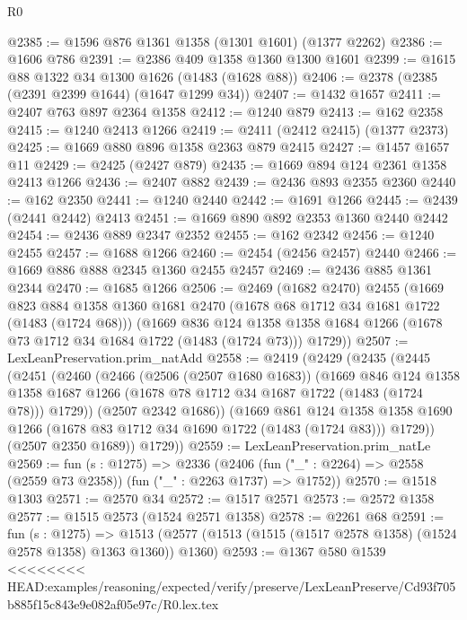 \begin{lexlean}{R0}
\begin{coremodule}
{{{{{{{{{{{{{{{{{{{{{{{{{{{{{{{{{{{{{{{{{{{{{{{{{{{{{{{{{{{{{{{{{{{{{{{{{{{{{{{{{{{{{{@2385 := @1596 @876 @1361 @1358 (@1301 @1601) (@1377 @2262)
@2386 := @1606 @786
@2391 := @2386 @409 @1358 @1360 @1300 @1601
@2399 := @1615 @88 @1322 @34 @1300 @1626 (@1483 (@1628 @88))
@2406 := @2378 (@2385 (@2391 @2399 @1644) (@1647 @1299 @34))
@2407 := @1432 @1657
@2411 := @2407 @763 @897 @2364 @1358
@2412 := @1240 @879
@2413 := @162 @2358
@2415 := @1240 @2413 @1266
@2419 := @2411 (@2412 @2415) (@1377 @2373)
@2425 := @1669 @880 @896 @1358 @2363 @879 @2415
@2427 := @1457 @1657 @11
@2429 := @2425 (@2427 @879)
@2435 := @1669 @894 @124 @2361 @1358 @2413 @1266
@2436 := @2407 @882
@2439 := @2436 @893 @2355 @2360
@2440 := @162 @2350
@2441 := @1240 @2440
@2442 := @1691 @1266
@2445 := @2439 (@2441 @2442) @2413
@2451 := @1669 @890 @892 @2353 @1360 @2440 @2442
@2454 := @2436 @889 @2347 @2352
@2455 := @162 @2342
@2456 := @1240 @2455
@2457 := @1688 @1266
@2460 := @2454 (@2456 @2457) @2440
@2466 := @1669 @886 @888 @2345 @1360 @2455 @2457
@2469 := @2436 @885 @1361 @2344
@2470 := @1685 @1266
@2506 := @2469
    (@1682 @2470)
    @2455
    (@1669
      @823
      @884
      @1358
      @1360
      @1681
      @2470
      (@1678 @68 @1712 @34 @1681 @1722 (@1483 (@1724 @68)))
      (@1669
        @836
        @124
        @1358
        @1358
        @1684
        @1266
        (@1678 @73 @1712 @34 @1684 @1722 (@1483 (@1724 @73)))
        @1729))
@2507 := LexLeanPreservation.prim_natAdd
@2558 := @2419
    (@2429
      (@2435
        (@2445
          (@2451
            (@2460
              (@2466
                (@2506 (@2507 @1680 @1683))
                (@1669
                  @846
                  @124
                  @1358
                  @1358
                  @1687
                  @1266
                  (@1678 @78 @1712 @34 @1687 @1722 (@1483 (@1724 @78)))
                  @1729))
              (@2507 @2342 @1686))
            (@1669
              @861
              @124
              @1358
              @1358
              @1690
              @1266
              (@1678 @83 @1712 @34 @1690 @1722 (@1483 (@1724 @83)))
              @1729))
          (@2507 @2350 @1689))
        @1729))
@2559 := LexLeanPreservation.prim_natLe
@2569 := fun (s : @1275) =>
  @2336 (@2406 (fun ("_" : @2264) => @2558 (@2559 @73 @2358)) (fun ("_" : @2263 @1737) => @1752))
@2570 := @1518 @1303
@2571 := @2570 @34
@2572 := @1517 @2571
@2573 := @2572 @1358
@2577 := @1515 @2573 (@1524 @2571 @1358)
@2578 := @2261 @68
@2591 := fun (s : @1275) =>
  @1513 (@2577 (@1513 (@1515 (@1517 @2578 @1358) (@1524 @2578 @1358) @1363 @1360)) @1360)
@2593 := @1367 @580 @1539
<<<<<<<< HEAD:examples/reasoning/expected/verify/preserve/LexLeanPreserve/Cd93f705b885f15c843e9e082af05e97c/R0.lex.tex
}}}}}}}}}}}}}}}}}}}}}}}}}}}}}}}}}}}}}}}}}}}}}}}}}}}}}}}}}}}}}}}}}}}}}}}}}}}}}}}}}}}}}}
\end{coremodule}
\end{lexlean}
